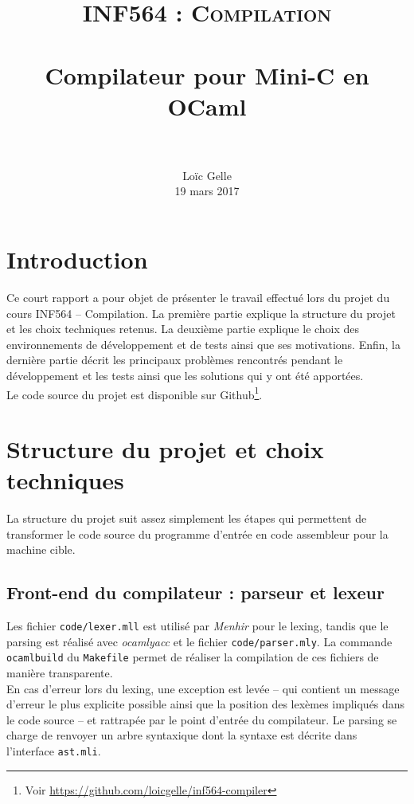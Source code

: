 \documentclass[paper=a4, fontsize=11pt]{scrartcl}
\title{	
		\usefont{OT1}{bch}{b}{n}
		\normalfont \normalsize \textsc{INF564 : Compilation} \\ [25pt]
		\horrule{0.5pt} \\[0.4cm]
		\huge Compilateur pour Mini-C en OCaml \\
		\horrule{2pt} \\[0.5cm]
}
\author{
		\normalfont 								\normalsize
        Lo\"{i}c Gelle\\[-3pt]		\normalsize
        19 mars 2017
}
\date{}
\numberwithin{figure}{section}			%
\numberwithin{table}{section}				%
\begin{document}
\maketitle
\section{Introduction}

Ce court rapport a pour objet de présenter le travail effectué lors du projet du cours INF564 -- Compilation. La première partie explique la structure du projet et les choix techniques retenus. La deuxième partie explique le choix des environnements de développement et de tests ainsi que ses motivations. Enfin, la dernière partie décrit les principaux problèmes rencontrés pendant le développement et les tests ainsi que les solutions qui y ont été apportées. \\

Le code source du projet est disponible sur Github\footnote{Voir \url{https://github.com/loicgelle/inf564-compiler}}.

\section{Structure du projet et choix techniques}

La structure du projet suit assez simplement les étapes qui permettent de transformer le code source du programme d'entrée en code assembleur pour la machine cible.

\subsection{Front-end du compilateur : parseur et lexeur}

Les fichier \texttt{code/lexer.mll} est utilisé par \textit{Menhir} pour le lexing, tandis que le parsing est réalisé avec \textit{ocamlyacc} et le fichier \texttt{code/parser.mly}. La commande \texttt{ocamlbuild} du \texttt{Makefile} permet de réaliser la compilation de ces fichiers de manière transparente.\\

En cas d'erreur lors du lexing, une exception est levée -- qui contient un message d'erreur le plus explicite possible ainsi que la position des lexèmes impliqués dans le code source -- et rattrapée par le point d'entrée du compilateur. Le parsing se charge de renvoyer un arbre syntaxique dont la syntaxe est décrite dans l'interface \texttt{ast.mli}.
\end{document}

